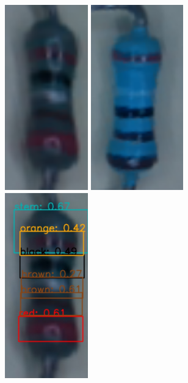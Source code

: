 \begin{figure}[H]
  \centering
  \begin{minipage}{0.49\textwidth}
    \centering
    \includegraphics[height=8cm]{imgs/cv/obb_resistor_grey_orange_black_silver_brown_red_830E-2-1_11.png}
  \end{minipage}
  \hfill
  \begin{minipage}{0.49\textwidth}
      \centering
      \includegraphics[height=8cm]{imgs/cv/obb_resistor_orange_white_black_brown_brown_390E1-1_21.png}
  \end{minipage}
  \par\medskip
  \begin{minipage}{0.49\textwidth}
    \centering
    \includegraphics[height=8cm]{imgs/cv/banddetectbad.jpg}

\end{minipage}
\end{figure}
